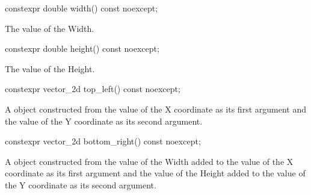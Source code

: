 \begin{itemdecl}
constexpr double width() const noexcept;
\end{itemdecl}
\begin{itemdescr}
\pnum
\returns
The value of the Width.
\end{itemdescr}

\begin{itemdecl}
constexpr double height() const noexcept;
\end{itemdecl}
\begin{itemdescr}
\pnum
\returns
The value of the Height.
\end{itemdescr}

\begin{itemdecl}
constexpr vector_2d top_left() const noexcept;
\end{itemdecl}
\begin{itemdescr}
\pnum
\returns
A  object constructed from the value of the X coordinate as its first argument and the value of the Y coordinate as its second argument.
\end{itemdescr}

\begin{itemdecl}
constexpr vector_2d bottom_right() const noexcept;
\end{itemdecl}
\begin{itemdescr}
\pnum
\returns
A  object constructed from the value of the Width added to the value of the X coordinate as its first argument and the value of the Height added to the value of the Y coordinate as its second argument.
\end{itemdescr}
